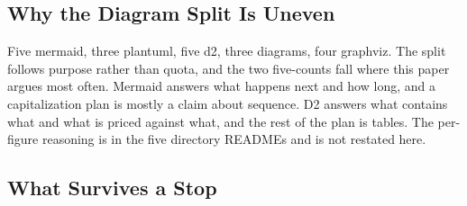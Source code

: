 \subsection{Why the Diagram Split Is Uneven}

Five mermaid, three plantuml, five d2, three diagrams, four graphviz. The split
follows purpose rather than quota, and the two five-counts fall where this paper
argues most often. Mermaid answers what happens next and how long, and a
capitalization plan is mostly a claim about sequence. D2 answers what contains
what and what is priced against what, and the rest of the plan is tables. The
per-figure reasoning is in the five directory READMEs and is not restated here.

\subsection{What Survives a Stop}

